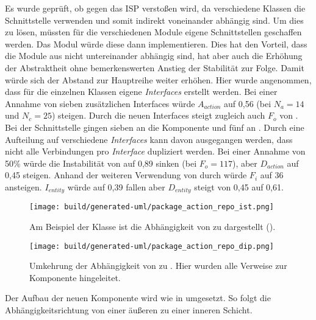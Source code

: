 Es wurde geprüft, ob gegen das \ac{ISP} verstoßen wird, da verschiedene Klassen die Schnittstelle  verwenden und somit indirekt voneinander abhängig sind. Um dies zu lösen, müssten für die verschiedenen Module eigene Schnittstellen geschaffen werden. Das Modul  würde diese dann implementieren. Dies hat den Vorteil, dass die Module aus  nicht untereinander abhängig sind, hat aber auch die Erhöhung der Abstraktheit ohne bemerkenswerten Anstieg der Stabilität zur Folge. Damit würde sich der Abstand zur Hauptreihe weiter erhöhen. Hier wurde angenommen, dass für die einzelnen Klassen eigene \textit{Interfaces} erstellt werden. Bei einer Annahme von sieben zusätzlichen Interfaces würde $A_{action}$ auf 0,56 (bei $N_a=14$ und $N_c = 25$) steigen. Durch die neuen Interfaces steigt zugleich auch $F_o$ von . Bei der Schnittstelle  gingen sieben an die Komponente  und fünf an . Durch eine Aufteilung auf verschiedene \textit{Interfaces} kann davon ausgegangen werden, dass nicht alle Verbindungen pro \textit{Interface} dupliziert werden. Bei einer Annahme von 50\%  würde die Instabilität von  auf 0,89 sinken (bei $F_o = 117$), aber $D_{action}$ auf 0,45 steigen. Anhand der weiteren Verwendung von  durch  würde $F_i$ auf 36 ansteigen. $I_{entity}$ würde auf 0,39 fallen aber $D_{entity}$ steigt von 0,45 auf 0,61.

\begin{figure}
  \centering
  \texttt{[image: build/generated-uml/package\_action\_repo\_ist.png]}
   \caption{Am Beispiel der Klasse  ist die Abhängigkeit von  zu  dargestellt ().}
   \label{fig:package_action_repo_ist}
\end{figure}

\begin{figure}
  \centering
  \texttt{[image: build/generated-uml/package\_action\_repo\_dip.png]}
   \caption{Umkehrung der Abhängigkeit von  zu . Hier wurden alle Verweise zur Komponente  hingeleitet.}
   \label{fig:package_action_repo_dip}
\end{figure}

Der Aufbau der neuen Komponente  wird wie in  umgesetzt. So folgt die Abhängigkeitsrichtung von einer äußeren zu einer inneren Schicht.

